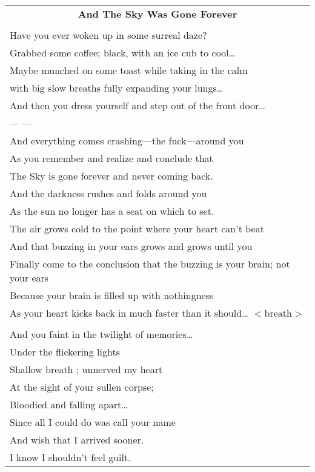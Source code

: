 \documentclass{article}
\begin{document}
\newcommand{\h}{\hspace*{4ex}}

\begin{center}
\begin{tabular}{l}
\multicolumn{1}{c}{\large\textbf{And The Sky Was Gone Forever}} \\
\\
Have you ever woken up in some surreal daze? \\
Grabbed some coffee; black, with an ice cub to cool\ldots{} \\
Maybe munched on some toast while taking in the calm \\
with big slow breaths fully expanding your lungs\ldots{} \\
And then you dress yourself and step out of the front door\ldots{} \\
--- ---\\
And everything comes crashing---the fuck---around you \\
As you remember and realize and conclude that \\
The Sky is gone forever and never coming back. \\
And the darkness rushes and folds around you \\
As the sun no longer has a seat on which to set. \\
The air grows cold to the point where your heart can't beat \\
And that buzzing in your ears grows and grows until you \\
Finally come to the conclusion that the buzzing is your brain; not your ears \\
Because your brain is filled up with nothingness \\
As your heart kicks back in much faster than it should\ldots{} $<\text{breath}>$ \\
\\
\h{}And you faint in the twilight of memories\ldots{} \\
\h{}Under the flickering lights \\
\h{}Shallow breath ; unnerved my heart \\
\h{}At the sight of your sullen corpse; \\
\h{}Bloodied and falling apart\ldots{} \\
\h{}Since all I could do was call your name \\
\h{}And wish that I arrived sooner. \\
\h{}I know I shouldn't feel guilt. \\

\end{tabular}
\end{center}
\end{document}
